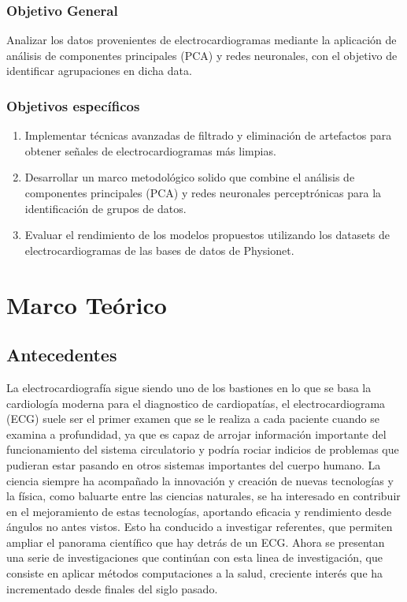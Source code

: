 \documentclass[spanish,11pt,letterpaper,oneside]{memoir}
\begin{document}
\subsection{Objetivo General}
Analizar los datos provenientes de electrocardiogramas mediante la aplicación de análisis de componentes principales (PCA) y redes neuronales, con el objetivo de identificar agrupaciones en dicha data.
\subsection{Objetivos específicos}
\begin{enumerate}
	\item Implementar técnicas avanzadas de filtrado y eliminación de artefactos para obtener señales de electrocardiogramas más limpias.
	\item Desarrollar un marco metodológico solido que combine el análisis de componentes principales (PCA) y redes neuronales perceptrónicas para la identificación de grupos de datos.
	\item Evaluar el rendimiento de los modelos propuestos utilizando los datasets de electrocardiogramas de las bases de datos de Physionet.
\end{enumerate}



\chapter{Marco Teórico}

\section{Antecedentes}
	
La electrocardiografía sigue siendo uno de los bastiones en lo que se basa la cardiología moderna para el diagnostico de cardiopatías, el electrocardiograma (ECG) suele ser el primer examen que se le realiza a cada paciente cuando se examina a profundidad, ya que es capaz de arrojar información importante del funcionamiento del sistema circulatorio y podría rociar indicios de problemas que pudieran estar pasando en otros sistemas importantes del cuerpo humano. La ciencia siempre ha acompañado la innovación y creación de nuevas tecnologías y la física, como baluarte entre las ciencias naturales, se ha interesado en contribuir en el mejoramiento de estas tecnologías, aportando eficacia y rendimiento desde ángulos no antes vistos. Esto ha conducido a investigar referentes, que permiten ampliar el panorama científico que hay detrás de un ECG. 
Ahora se presentan una serie de investigaciones que continúan con esta linea de investigación, que consiste en aplicar métodos computaciones a la salud, creciente interés que ha incrementado desde finales del siglo pasado. \\
	
\end{document}
